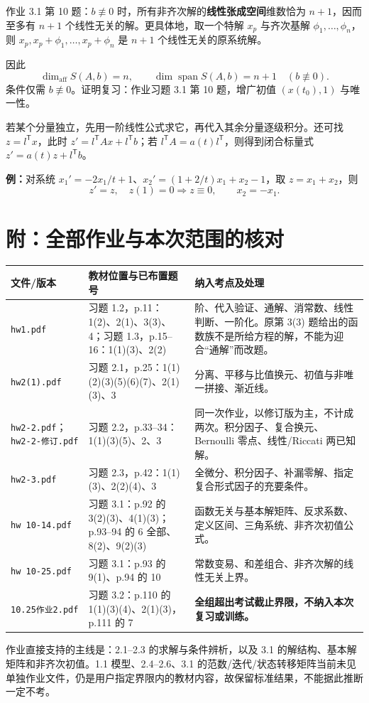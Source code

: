 作业 3.1 第 10 题：$b\not\equiv0$ 时，所有非齐次解的\textbf{线性张成空间}维数恰为 $n+1$，因而至多有 $n+1$ 个线性无关的解。更具体地，取一个特解 $x_p$ 与齐次基解 $\phi_1,\ldots,\phi_n$，则 $x_p,x_p+\phi_1,\ldots,x_p+\phi_n$ 是 $n+1$ 个线性无关的原系统解。

因此
\[
\dim_{\mathrm{aff}}S(A,b)=n,\qquad
\dim\operatorname{span}S(A,b)=n+1\quad(b\not\equiv0).
\]
条件仅需 $b\not\equiv0$。证明复习：作业习题 3.1 第 10 题，增广初值 $(x(t_0),1)$ 与唯一性。

若某个分量独立，先用一阶线性公式求它，再代入其余分量逐级积分。还可找 $z=l^{\mathsf T}x$，此时 $z'=l^{\mathsf T}Ax+l^{\mathsf T}b$；若 $l^{\mathsf T}A=a(t)l^{\mathsf T}$，则得到闭合标量式 $z'=a(t)z+l^{\mathsf T}b$。

\textbf{例：}对系统 $x_1'=-2x_1/t+1$、$x_2'=(1+2/t)x_1+x_2-1$，取 $z=x_1+x_2$，则
\[
z'=z,\quad z(1)=0\Rightarrow z\equiv0,\qquad x_2=-x_1.
\]

\section*{附：全部作业与本次范围的核对}
\small
\begin{longtable}{p{.22\linewidth}p{.30\linewidth}p{.40\linewidth}}
\toprule 文件/版本 & 教材位置与已布置题号 & 纳入考点及处理\\\midrule\endhead
\texttt{hw1.pdf} & 习题 1.2，p.11：1(2)、2(1)、3(3)、4；习题 1.3，p.15--16：1(1)(3)、2(2) & 阶、代入验证、通解、消常数、线性判断、一阶化。原第 3(3) 题给出的函数族不是所给方程的解，不能为迎合“通解”而改题。\\
\texttt{hw2(1).pdf} & 习题 2.1，p.25：1(1)(2)(3)(5)(6)(7)、2(1)(3)、3 & 分离、平移与比值换元、初值与非唯一拼接、渐近线。\\
\texttt{hw2-2.pdf}；\texttt{hw2-2-修订.pdf} & 习题 2.2，p.33--34：1(1)(3)(5)、2、3 & 同一次作业，以修订版为主，不计成两次。积分因子、复合换元、Bernoulli 零点、线性/Riccati 两已知解。\\
\texttt{hw2-3.pdf} & 习题 2.3，p.42：1(1)(3)、2(2)(4)、3 & 全微分、积分因子、补漏零解、指定复合形式因子的充要条件。\\
\texttt{hw 10-14.pdf} & 习题 3.1：p.92 的 3(2)(3)、4(1)(3)；p.93--94 的 6 全部、8(2)、9(2)(3) & 函数无关与基本解矩阵、反求系数、定义区间、三角系统、非齐次初值公式。\\
\texttt{hw 10-25.pdf} & 习题 3.1：p.93 的 9(1)、p.94 的 10 & 常数变易、和差组合、非齐次解的线性无关上界。\\
\texttt{10.25作业2.pdf} & 习题 3.2：p.110 的 1(1)(3)(4)、2(1)(3)，p.111 的 7 & \textbf{全组超出考试截止界限，不纳入本次复习或训练。}\\\bottomrule
\end{longtable}
\normalsize
作业直接支持的主线是：2.1--2.3 的求解与条件辨析，以及 3.1 的解结构、基本解矩阵和非齐次初值。1.1 模型、2.4--2.6、3.1 的范数/迭代/状态转移矩阵当前未见单独作业文件，仍是用户指定界限内的教材内容，故保留标准结果，不能据此推断一定不考。

